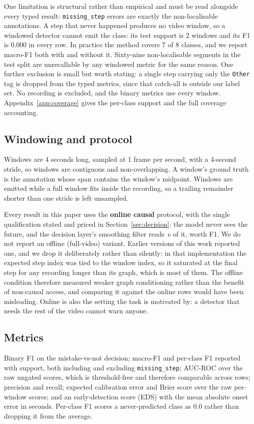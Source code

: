 \documentclass[10pt,twocolumn]{article}
\begin{document}
One limitation is structural rather than empirical and must be read alongside
every typed result: \texttt{missing\_step} errors are exactly the
non-localisable annotations. A step that never happened produces no video window,
so a windowed detector cannot emit the class: its test support is 2 windows
and its F1 is 0.000 in every row. In practice the method covers 7 of 8 classes,
and we report macro-F1 both with and without it. Sixty-nine non-localisable
segments in the test split are unrecallable by any windowed metric for the same
reason. One further exclusion is small but worth stating: a single step carrying
only the \texttt{Other} tag is dropped from the typed metrics, since that
catch-all is outside our label set. No recording is excluded, and the binary
metrics use every window. Appendix~\ref{app:coverage} gives the per-class support
and the full coverage accounting.

\subsection{Windowing and protocol}
Windows are 4 seconds long, sampled at 1 frame per second, with a 4-second
stride, so windows are contiguous and non-overlapping. A window's ground truth is the
annotation whose span contains the window's midpoint. Windows are emitted while a
full window fits inside the recording, so a trailing remainder shorter than one
stride is left unsampled.

Every result in this paper uses the \textbf{online causal} protocol, with the
single qualification stated and priced in Section~\ref{sec:decision}: the model
never sees the future, and the decision layer's smoothing filter reads
\csLook{}\,s of it, worth \csDelta{} F1. We do not report
an offline (full-video) variant. Earlier versions of this work reported one, and
we drop it deliberately rather than silently: in that implementation the expected
step index was tied to the window index, so it saturated at the final step for
any recording longer than its graph, which is most of them. The offline
condition therefore measured weaker graph conditioning rather than the benefit of
non-causal access, and comparing it against the online rows would have been
misleading. Online is also the setting the task is motivated by: a detector that
needs the rest of the video cannot warn anyone.

\subsection{Metrics}
Binary F1 on the mistake-vs-not decision; macro-F1 and per-class F1 reported with
support, both including and excluding \texttt{missing\_step}; AUC-ROC over the
raw ungated scores, which is threshold-free and therefore comparable across
rows; precision and recall; expected calibration error and Brier score over the
raw per-window scores; and an early-detection score (EDS) with the mean absolute
onset error in seconds. Per-class F1 scores a never-predicted class as $0.0$
rather than dropping it from the average.
\end{document}
